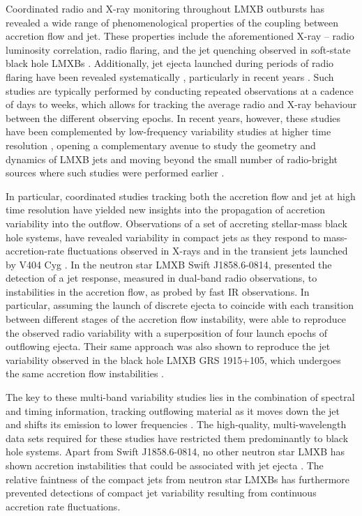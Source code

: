\documentclass[fleqn,usenatbib]{mnras}
\begin{document}
Coordinated radio and X-ray monitoring throughout LMXB outbursts has revealed a wide range of phenomenological properties of the coupling between accretion flow and jet. These properties include the aforementioned X-ray -- radio luminosity correlation, radio flaring, and the jet quenching observed in soft-state black hole LMXBs \citep{vadawale2003,fender2004outburststates,russell2020}. Additionally, jet ejecta launched during periods of radio flaring have been revealed systematically \citep{mirabel1994}, particularly in recent years \citep{russel2019,carotenuto2021,wood2021}. Such studies are typically performed by conducting repeated observations at a cadence of days to weeks, which allows for tracking the average radio and X-ray behaviour between the different observing epochs. In recent years, however, these studies have been complemented by low-frequency variability studies at higher time resolution \citep[e.g.,][]{atetarenko2021,vandeneijnden2020}, opening a complementary avenue to study the geometry and dynamics of LMXB jets and moving beyond the small number of radio-bright sources where such studies were performed earlier \citep[e.g.,][]{pooley1997}. 

In particular, coordinated studies tracking both the accretion flow and jet at high time resolution have yielded new insights into the propagation of accretion variability into the outflow. Observations of a set of accreting stellar-mass black hole systems, have revealed variability in compact jets as they respond to mass-accretion-rate fluctuations observed in X-rays \citep[Cyg X-1 and MAXI J1820+070;][]{atetarenko2019_cygx1,atetarenko2021} and in the transient jets launched by V404 Cyg \citep{atetarenko2017,atetarenko2021}. In the neutron star LMXB Swift J1858.6-0814, \citet{vincentelli2023} presented the detection of a jet response, measured in dual-band radio observations, to instabilities in the accretion flow, as probed by fast IR observations. In particular, assuming the launch of discrete ejecta to coincide with each transition between different stages of the accretion flow instability, \citet{vincentelli2023} were able to reproduce the observed radio variability with a superposition of four launch epochs of outflowing ejecta. Their same approach was also shown to reproduce the jet variability observed in the black hole LMXB GRS 1915+105, which undergoes the same accretion flow instabilities \citep[][]{pooley1997}. 

The key to these multi-band variability studies lies in the combination of spectral and timing information, tracking outflowing material as it moves down the jet and shifts its emission to lower frequencies \citep{blandford1979}. The high-quality, multi-wavelength data sets required for these studies have restricted them predominantly to black hole systems. Apart from Swift J1858.6-0814, no other neutron star LMXB has shown accretion instabilities that could be associated with jet ejecta \citep{vincentelli2023}. The relative faintness of the compact jets from neutron star LMXBs has furthermore prevented detections of compact jet variability resulting from continuous accretion rate fluctuations. 
\end{document}
